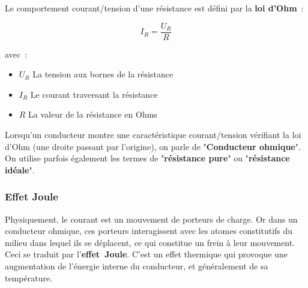 Le comportement courant/tension d'une résistance est défini par la \textbf{loi d'Ohm}~:\\
\begin{center}
\begin{minipage}{.2\textwidth}
\begin{center}

\end{center}
\end{minipage}
\hspace{1cm}
\begin{minipage}{.3\textwidth} 
\begin{equation}
	I_R = \dfrac{U_R}{R}
\end{equation}
\end{minipage}
\end{center}

avec~:\\

\begin{itemize}
\item $U_R$ La tension aux bornes de la résistance
\item $I_R$ Le courant traversant la résistance
\item $R$ La valeur de la résistance en Ohms\\
\end{itemize}


Lorsqu'un conducteur montre une caractéristique courant/tension vérifiant la loi d'Ohm (une droite passant par l'origine), on parle de "\textbf{Conducteur ohmique}". On utilise parfois également les termes de "\textbf{résistance pure}" ou "\textbf{résistance idéale}".

\subsubsection*{Effet Joule}

Physiquement, le courant est un mouvement de porteurs de charge. Or dans un conducteur ohmique, ces porteurs interagissent avec les atomes constitutifs du milieu dans lequel ils se déplacent, ce qui constitue un frein à leur mouvement. Ceci se traduit par l'\textbf{effet~Joule}. C'est un effet thermique qui provoque une augmentation de l'énergie interne du conducteur, et généralement de sa température. \\


